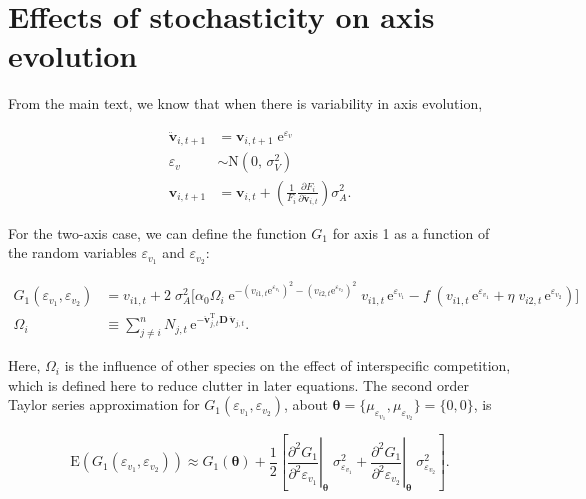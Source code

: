 \section*{Effects of stochasticity on axis evolution}

From the main text, we know that when there is variability in axis evolution, 

\begin{equation*}
\begin{split}
    \mathbf{\ddot{v}}_{i,t+1} &= \mathbf{v}_{i,t+1} \; \text{e}^{\varepsilon_v} \\
    \varepsilon_v &\sim \text{N}(0, \, \sigma^2_V) \\
    \mathbf{v}_{i,t+1} &= \mathbf{v}_{i,t} + \left( \frac{1}{F_i}
        \frac{\partial F_i}{\partial \mathbf{\ddot{v}}_{i,t}} \right) \sigma_A^2
    \text{.}
\end{split}
\end{equation*}



For the two-axis case, we can define the function $G_1$ for axis 1 as a function 
of the random variables $\varepsilon_{v_1}$ and $\varepsilon_{v_2}$:

\begin{equation*}
\begin{split}
    G_1(\varepsilon_{v_1}, \varepsilon_{v_2}) &= v_{i1,t} + 2 \; \sigma_A^2
    \Bigg[
        \alpha_0
            \Omega_i \;
            \text{e}^{-(v_{i1,t} \text{e}^{\varepsilon_{v_1}})^2 - (v_{i2,t} \text{e}^{\varepsilon_{v_2}})^2} \; v_{i1,t} \, 
            \text{e}^{\varepsilon_{v_1}}
        - f \; ( v_{i1,t} \, \text{e}^{\varepsilon_{v_1}} + \eta \; v_{i2,t} \,
            \text{e}^{\varepsilon_{v_2}} )
    \Bigg] \\
    \Omega_i &\equiv \sum_{j \ne i}^{n}{ N_{j,t} \, \textrm{e}^{
                    - \mathbf{\ddot{v}}_{j,t}^{\textrm{T}}
                    \mathbf{D} \, \mathbf{\ddot{v}}_{j,t} } }
    \textrm{.}
\end{split}
\end{equation*}

Here, $\Omega_i$ is the influence of other species on the effect of interspecific competition,
which is defined here to reduce clutter in later equations.
The second order Taylor series approximation for $G_1(\varepsilon_{v_1}, \varepsilon_{v_2})$,
about $\bm{\theta} = \{ \mu_{\varepsilon_{v_1}}, \mu_{\varepsilon_{v_2}} \} = \{ 0, 0 \}$, is

\begin{equation}
\label{eq:taylor-expansion-outline}
    \text{E}(G_1(\varepsilon_{v_1}, \varepsilon_{v_2})) \approx G_1(\bm{\theta}) + 
        \frac{1}{2} \left[ 
            \left. \frac{\partial^2 G_1}{\partial^2 \varepsilon_{v_1}} \right\lvert_{\bm{\theta}} \; \sigma^2_{\varepsilon_{v_1}} +
            \left. \frac{\partial^2 G_1}{\partial^2 \varepsilon_{v_2}} \right\lvert_{\bm{\theta}} \; \sigma^2_{\varepsilon_{v_2}}
        \right]
\text{.}
\end{equation}


